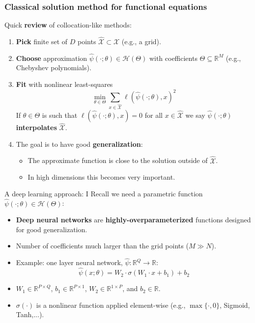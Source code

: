 \documentclass[aspectratio=169,10pt]{beamer}
\newcommand{\emphcolor}[1]{\textbf{\textcolor{emphcolorval}{#1}}}
\newcommand{\R}{\ensuremath{\mathbb{R}}}
\newcommand{\Xdom}{\mathcal{X}}
\newcommand{\Xtrain}{\hat{\mathcal{X}}}
\begin{document}
\begin{frame}
	\frametitle{Classical solution method for functional equations}
	
	Quick \emphcolor{review} of collocation-like methods:
	
	\begin{enumerate}
		\item \emphcolor{Pick} finite set of $D$ points $\Xtrain \subset \Xdom$ (e.g., a grid).
		\smallskip
		\item \emphcolor{Choose} approximation $\hat{\psi}(\cdot;\theta) \in \mathcal{H}(\Theta)$ with coefficients $\Theta \subseteq \R^M$ (e.g., Chebyshev polynomials).
		\smallskip
		\item \emphcolor{Fit} with nonlinear least-squares 
		$$
		\min_{\theta \in \Theta} \sum_{x \in \Xtrain} \ell(\hat{\psi}(\cdot;\theta),x)^2
		$$
		\smallskip
		If $\theta \in \Theta$ is such that $\ell(\hat{\psi}(\cdot;\theta),x) = 0$ for all $x \in \Xtrain$ we say $\hat{\psi}(\cdot;\theta)$ \emphcolor{interpolates} $\Xtrain$.
		\smallskip
		\item The goal is to have good \emphcolor{generalization}:
		\begin{itemize}\smallskip
			\item The approximate function is close to the solution outside of $\Xtrain$.\smallskip
			\item In high dimensions this becomes very important.
		\end{itemize}
	\end{enumerate}
\end{frame}


\begin{frame}{A deep learning approach: I}
 Recall we need a parametric function $\hat{\psi}(\cdot;\theta) \in \mathcal{H}(\Theta)$:
	\begin{itemize}
		\item \emphcolor{Deep neural networks} are \emphcolor{highly-overparameterized} functions designed for good generalization.\medskip
		\item Number of coefficients much larger than the grid points ($M\gg N$). \medskip
	
		\item Example: one layer neural network, $\hat{\psi} : \mathbb{R}^Q\rightarrow \mathbb{R}$:
		\begin{equation*}
			\hat{\psi}(x;\theta) = W_2 \cdot \sigma \left(W_1\cdot x+b_1\right)+b_2
		\end{equation*}
		\medskip
		\item $W_1\in \mathbb{R}^{P\times Q}$, $b_1\in \mathbb{R}^{P\times 1}$, $W_2 \in \mathbb{R}^{1\times P}$, and $b_2 \in \mathbb{R}$.\smallskip
		\item $\sigma(\cdot)$ is a nonlinear function applied element-wise (e.g., $\max\{\cdot,0\}$, Sigmoid, Tanh,...).
	\end{itemize}	
\end{frame}
\end{document}
